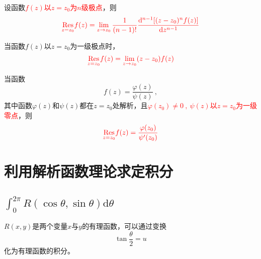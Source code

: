 \documentclass[12pt,a4paper]{article}
\newcommand{\dif}{\mathrm{d}}
\begin{document}
\begin{tcolorbox}[colback=green!5,colframe=green!40!black,title= Theorem]
设函数\textcolor{red}{$f(z)$以$z=z_0$为$n$级极点}，则
\begin{equation}
\color{red} \underset{z = z_0}{\rm Res} f(z) = \lim\limits_{z\rightarrow z_0} \frac{1}{(n-1)!} \frac{\dif^{n-1} [(z-z_0)^n f(z)]}{\dif z^{n-1}}
\end{equation}
\end{tcolorbox}


\begin{tcolorbox}[colback=green!5,colframe=green!40!black,title= Theorem]
当函数$f(z)$以$z=z_0$为一级极点时，
\begin{equation}
\color{red} \underset{z = z_0}{\rm Res} f(z) = \lim\limits_{z\rightarrow z_0} (z-z_0) f(z)
\end{equation}
\end{tcolorbox}


\begin{tcolorbox}[colback=green!5,colframe=green!40!black,title= Theorem]
当函数
\begin{equation}
f(z) = \frac{\varphi(z)}{\psi(z)} ~,
\end{equation}
其中函数$\varphi(z)$和$\psi(z)$都在$z=z_0$处解析，且\textcolor{red}{$\varphi(z_0) \neq 0 ~, ~\psi(z)$以$z=z_0$为一级零点}，则
\begin{equation}
\color{red} \underset{z = z_0}{\rm Res} f(z) = \frac{\varphi(z_0)}{\psi^{\prime}(z_0)}
\end{equation}
\end{tcolorbox}



\section{利用解析函数理论求定积分}
\subsection{$\int_0^{2\pi} R(\cos \theta, \sin \theta) \dif \theta$}
$R(x, y)$是两个变量$x$与$y$的有理函数，可以通过变换
\begin{equation}
\tan \frac{\theta}{2} = u
\end{equation}
化为有理函数的积分。
\end{document}
